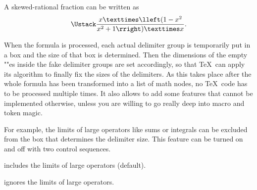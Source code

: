 \documentclass{longmath-doc}
\begin{document}
\begin{exec}
  A skewed-rational fraction can be written as   
  $$ \frac{ x × \lleft( 1 - x^2 }{ x^2 + 1 \rright) × x } . $$
\end{exec}
When the formula is processed, each actual delimiter group is temporarily put in a box and the size of that box is determined. Then the dimensions of the empty "\hbox"es inside the fake delimiter groups are set accordingly, so that \TeX\ can apply its algorithm to finally fix the sizes of the delimiters. As this takes place after the whole formula has been transformed into a list of math nodes, no \TeX\ code has to be processed multiple times. It also allows to add some features that cannot be implemented otherwise, unless you are willing to go really deep into macro and token magic. 

For example, the limits of large operators like sums or integrals can be excluded from the box that determines the delimiter size. This feature can be turned on and off with two control sequences.

 includes the limits of large operators (default). 

 ignores the limits of large operators. 
\end{document}
